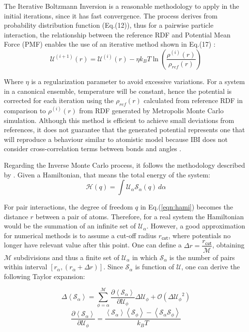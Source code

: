 \documentclass[10pt,a4paper,twoside]{article}
\begin{document}
 The Iterative Boltzmann Inversion is a reasonable methodology to apply in the initial iterations, since it has fast convergence. The process derives from probability distribution function (Eq.(12)), thus for a pairwise particle interaction, the relationship between the reference RDF and Potential Mean Force (PMF) enables the use of an iterative method shown in Eq.(17) \cite{ibi}:
   \begin{equation}
\mathcal{U}^{(i+1)}(r) = \mathcal{U}^{(i)}(r) - \eta k_B T \ln{\left(\dfrac{\rho^{(i)}(r)}{\rho_{ref}(r)}\right)}
\label{eqn:ibi}
\end{equation}

 Where $\eta$ is a regularization parameter to avoid excessive variations. For a system in a canonical ensemble, temperature will be constant, hence the potential is corrected for each iteration using the $\rho_{ref}(r)$ calculated from reference RDF in comparison to $\rho^{(i)}(r)$ from  RDF generated by Metropolis Monte Carlo simulation. Although this method is efficient to achieve small deviations from references, it does not guarantee that the generated potential represents one that will reproduce a behaviour similar to atomistic model because IBI does not consider cross-correlation terms between bonds and angles \cite{magic}.   
 
 Regarding the Inverse Monte Carlo process, it follows the methodology described by . Given a Hamiltonian, that means the total energy of the system:
 \begin{equation}
\mathcal{H}(q) = \displaystyle \int \mathcal{U}_\alpha\mathcal{S}_\alpha(q) \,d\alpha
\label{eqn:hami}
\end{equation}

For pair interactions, the degree of freedom $q$ in Eq.(\ref{eqn:hami}) becomes the distance $r$ between a pair of atoms. Therefore, for a real system the Hamiltonian would be the summation of an infinite set of $\mathcal{U}_\alpha$. However, a good approximation for numerical methods is to assume a cut-off radius $r_{\mathsf{cut}}$, where potentials no longer have relevant value after this point. One can define a $\Delta r = \dfrac{r_{\mathsf{cut}}}{\mathcal{M}}$, obtaining $\mathcal{M}$ subdivisions and thus a finite set of  $\mathcal{U}_{\alpha}$ in which $\mathcal{S}_\alpha$ is the number of pairs within  interval $[r_\alpha,(r_\alpha + \Delta r)]$. Since $\mathcal{S}_\alpha$ is function of $\mathcal{U}$, one can derive the following Taylor expansion:

 \begin{equation}
\Delta\left\langle\mathcal{S}_\alpha\right\rangle = \sum_{\phi=\alpha}^\mathcal{M}\dfrac{\partial\left\langle\mathcal{S}_\alpha\right\rangle}{\partial\mathcal{U}_\phi}\Delta\mathcal{U}_\phi + \mathcal{O}({\Delta\mathcal{U}_\phi}^2)
\label{eqn:inv1}
\end{equation}
 \begin{equation}
\dfrac{\partial\left\langle\mathcal{S}_\alpha\right\rangle}{\partial\mathcal{U}_\phi} = \dfrac{ \left\langle\mathcal{S}_\alpha\right\rangle\left\langle\mathcal{S}_\phi\right\rangle - \left\langle\mathcal{S}_\alpha\mathcal{S}_\phi\right\rangle}{k_B T}
\label{eqn:inv2}
\end{equation}
\end{document}
